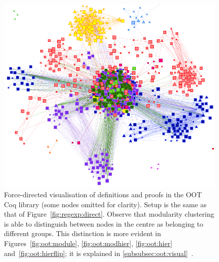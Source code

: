 \begin{figure}[tp]
\centering
\includegraphics[height=0.35\textheight]{img/oot/direct}
\caption{Force-directed visualisation of definitions and proofs in the OOT Coq
  library (some nodes omitted for clarity). Setup is the same as that of
  Figure~\ref{fig:regexp:direct}. Observe that modularity clustering is able to
  distinguish between nodes in the centre as belonging to different groups. This
  distinction is more evident in Figures~\ref{fig:oot:module},
  \ref{fig:oot:modhier}, \ref{fig:oot:hier}
  and~\ref{fig:oot:hierflip}; it is explained in
  \ref{subsubsec:oot:visual}~.}\label{fig:oot:direct}
\end{figure}

